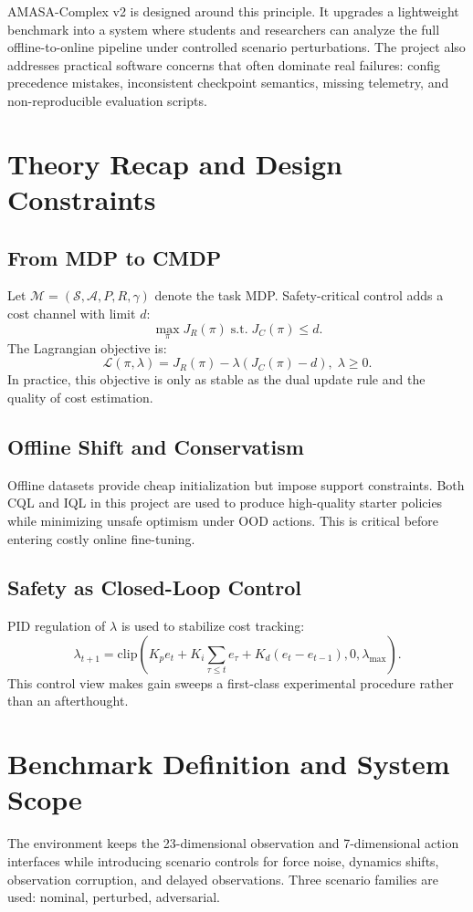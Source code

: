 \documentclass[conference]{IEEEtran}
\begin{document}
AMASA-Complex v2 is designed around this principle. It upgrades a lightweight benchmark into a system where students and researchers can analyze the full offline-to-online pipeline under controlled scenario perturbations. The project also addresses practical software concerns that often dominate real failures: config precedence mistakes, inconsistent checkpoint semantics, missing telemetry, and non-reproducible evaluation scripts.

\section{Theory Recap and Design Constraints}
\subsection{From MDP to CMDP}
Let $\mathcal{M}=(\mathcal{S},\mathcal{A},P,R,\gamma)$ denote the task MDP. Safety-critical control adds a cost channel with limit $d$:
\[
\max_{\pi} J_R(\pi)\;\text{s.t.}\;J_C(\pi)\le d.
\]
The Lagrangian objective is:
\[
\mathcal{L}(\pi,\lambda)=J_R(\pi)-\lambda(J_C(\pi)-d),\;\lambda\ge0.
\]
In practice, this objective is only as stable as the dual update rule and the quality of cost estimation.

\subsection{Offline Shift and Conservatism}
Offline datasets provide cheap initialization but impose support constraints. Both CQL and IQL in this project are used to produce high-quality starter policies while minimizing unsafe optimism under OOD actions. This is critical before entering costly online fine-tuning.

\subsection{Safety as Closed-Loop Control}
PID regulation of $\lambda$ is used to stabilize cost tracking:
\[
\lambda_{t+1}=\mathrm{clip}(K_p e_t + K_i\sum_{\tau\le t} e_\tau + K_d(e_t-e_{t-1}),0,\lambda_{\max}).
\]
This control view makes gain sweeps a first-class experimental procedure rather than an afterthought.

\section{Benchmark Definition and System Scope}
The environment keeps the 23-dimensional observation and 7-dimensional action interfaces while introducing scenario controls for force noise, dynamics shifts, observation corruption, and delayed observations. Three scenario families are used: nominal, perturbed, adversarial.
\end{document}
